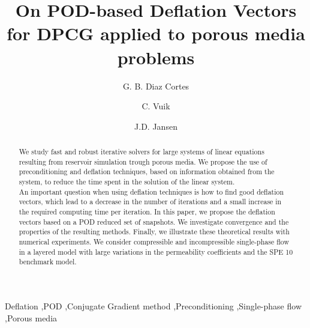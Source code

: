 \documentclass[review]{elsarticle}
\begin{document}
\begin{frontmatter}

\title{On POD-based Deflation Vectors for DPCG applied to porous media problems}


\author[mymainaddress]{G. B. Diaz Cortes}
\author[mymainaddress]{C. Vuik}
\author[mysecondaryaddress] {J.D. Jansen}


\address[mymainaddress]{Faculty of Electrical Engineering, Mathematics and Computer Science, Delft University of Technology,
Mekelweg 4, 2628 CD Delft, The Netherlands
}
\address[mysecondaryaddress]{Faculty of Civil Engineering and Geosciences, Delft University of Technology,
Stevinweg 1, 2628 CN Delft, The Netherlands}

\begin{abstract}
     We study fast and robust iterative solvers for large systems of  linear equations resulting from reservoir
     simulation trough porous media. We propose the use of preconditioning and deflation techniques, based on 
     information obtained from the system, to reduce the time spent in the solution of the linear system.\\
     An important question when using deflation techniques is how to find good deflation vectors, which lead to a decrease in the number of iterations 
     and a small increase in the required computing time per iteration. In this paper, we propose the deflation vectors
     based on a POD reduced set of snapshots. We investigate convergence and the properties of the resulting methods. 
     Finally, we illustrate these theoretical results with numerical experiments.  
 We consider compressible and incompressible single-phase flow in a layered model with large variations in the 
 permeability coefficients and the SPE 10 benchmark model.
\end{abstract}

\begin{keyword}
Deflation \sep POD \sep Conjugate Gradient method \sep Preconditioning \sep Single-phase flow \sep Porous media
\end{keyword}

\end{frontmatter}
\end{document}
